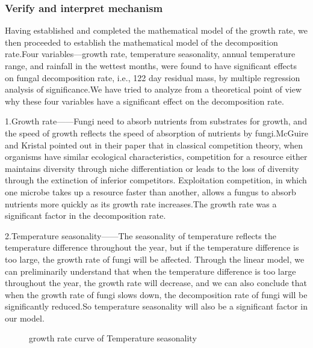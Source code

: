 \documentclass[12pt]{article}
\begin{document}
	\subsubsection{Verify and interpret mechanism}
	Having established and completed the mathematical model of the growth rate, we then proceeded to establish the mathematical model of the decomposition rate.Four variables—growth rate, temperature seasonality, annual temperature range, and rainfall in the wettest months, were found to have significant effects on fungal decomposition rate, i.e., 122 day residual mass, by multiple regression analysis of significance.We have tried to analyze from a theoretical point of view why these four variables have a significant effect on the decomposition rate.
	\par
	
	1.Growth rate——Fungi need to absorb nutrients from substrates for growth, and the speed of growth reflects the speed of absorption of nutrients by fungi.McGuire and Kristal pointed out in their paper that in classical competition theory\cite{4}, when organisms have similar ecological characteristics, competition for a resource either maintains diversity through niche differentiation or leads to the loss of diversity through the extinction of inferior competitors. Exploitation competition, in which one microbe takes up a resource faster than another, allows a fungus to absorb nutrients more quickly as its growth rate increases.The growth rate was a significant factor in the decomposition rate.\par
	
	2.Temperature seasonality——The seasonality of temperature reflects the temperature difference throughout the year, but if the temperature difference is too large, the growth rate of fungi will be affected. Through the linear model, we can preliminarily understand that when the temperature difference is too large throughout the year, the growth rate will decrease, and we can also conclude that when the growth rate of fungi slows down, the decomposition rate of fungi will be significantly reduced.So temperature seasonality will also be a significant factor in our model.\par
	
	\begin{figure}[ht]
		\centering
		\caption{growth rate curve of Temperature seasonality}
		\label{figure:Temperature_Seasonality_growth_rate}
	\end{figure}
	
\end{document}
